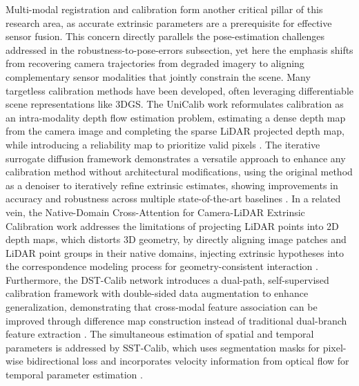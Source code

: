 \documentclass[11pt]{article}
\begin{document}
Multi-modal registration and calibration form another critical pillar of this research area, as accurate extrinsic parameters are a prerequisite for effective sensor fusion. This concern directly parallels the pose-estimation challenges addressed in the robustness-to-pose-errors subsection, yet here the emphasis shifts from recovering camera trajectories from degraded imagery to aligning complementary sensor modalities that jointly constrain the scene. Many targetless calibration methods have been developed, often leveraging differentiable scene representations like 3DGS. The UniCalib work reformulates calibration as an intra-modality depth flow estimation problem, estimating a dense depth map from the camera image and completing the sparse LiDAR projected depth map, while introducing a reliability map to prioritize valid pixels \cite{ref314}. The iterative surrogate diffusion framework demonstrates a versatile approach to enhance any calibration method without architectural modifications, using the original method as a denoiser to iteratively refine extrinsic estimates, showing improvements in accuracy and robustness across multiple state-of-the-art baselines \cite{ref315}. In a related vein, the Native-Domain Cross-Attention for Camera-LiDAR Extrinsic Calibration work addresses the limitations of projecting LiDAR points into 2D depth maps, which distorts 3D geometry, by directly aligning image patches and LiDAR point groups in their native domains, injecting extrinsic hypotheses into the correspondence modeling process for geometry-consistent interaction \cite{ref316}. Furthermore, the DST-Calib network introduces a dual-path, self-supervised calibration framework with double-sided data augmentation to enhance generalization, demonstrating that cross-modal feature association can be improved through difference map construction instead of traditional dual-branch feature extraction \cite{ref317}. The simultaneous estimation of spatial and temporal parameters is addressed by SST-Calib, which uses segmentation masks for pixel-wise bidirectional loss and incorporates velocity information from optical flow for temporal parameter estimation \cite{ref318}.
\end{document}
